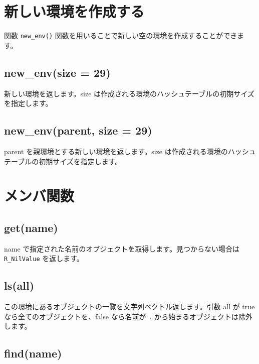 \documentclass[]{book}
\begin{document}
\section{新しい環境を作成する}

関数 \texttt{new\_env()} 関数を用いることで新しい空の環境を作成することができます。

\hypertarget{new_envsize-29}{%
\subsection{new\_env(size = 29)}\label{new_envsize-29}}

新しい環境を返します。size は作成される環境のハッシュテーブルの初期サイズを指定します。

\hypertarget{new_envparent-size-29}{%
\subsection{new\_env(parent, size = 29)}\label{new_envparent-size-29}}

parent を親環境とする新しい環境を返します。size は作成される環境のハッシュテーブルの初期サイズを指定します。

\hypertarget{-4}{%
\section{メンバ関数}\label{-4}}

\hypertarget{getname}{%
\subsection{get(name)}\label{getname}}

name で指定された名前のオブジェクトを取得します。見つからない場合は \texttt{R\_NilValue} を返します。

\hypertarget{lsall}{%
\subsection{ls(all)}\label{lsall}}

この環境にあるオブジェクトの一覧を文字列ベクトル返します。引数 all が true なら全てのオブジェクトを、false なら名前が \texttt{.} から始まるオブジェクトは除外します。

\hypertarget{findname}{%
\subsection{find(name)}\label{findname}}
\end{document}
